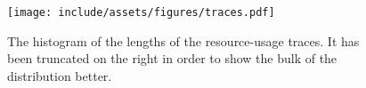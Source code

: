 \begin{figure}[t]
  \centering
  \texttt{[image: include/assets/figures/traces.pdf]}
  \caption{
    The histogram of the lengths of the resource-usage traces. It has been
    truncated on the right in order to show the bulk of the distribution better.
  }
  \vspace{-1.5em}
\end{figure}

